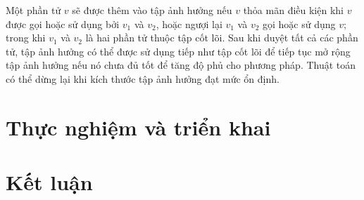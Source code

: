 \documentclass[12pt]{report}
\begin{document}
Một phần tử $v$ sẽ được thêm vào tập ảnh hưởng nếu $v$ thỏa mãn điều kiện khi $v$ được gọi hoặc sử dụng bởi $v_1$ và $v_2$, hoặc ngượi lại $v_1$ và $v_2$ gọi hoặc sử dụng $v$; trong khi $v_1$ và $v_2$ là hai phần tử thuộc tập cốt lõi. Sau khi duyệt tất cả các phần tử, tập ảnh hưởng có thể được sử dụng tiếp như tập cốt lõi để tiếp tục mở rộng tập ảnh hưởng nếu nó chưa đủ tốt để tăng độ phủ cho phương pháp. Thuật toán có thể dừng lại khi kích thước tập ảnh hưởng đạt mức ổn định.
\chapter{Thực nghiệm và triển khai}
\chapter{Kết luận}
\end{document}

